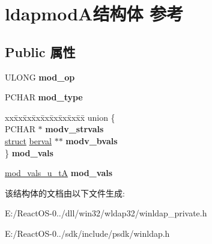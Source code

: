 \hypertarget{structldapmod_a}{}\section{ldapmod\+A结构体 参考}
\label{structldapmod_a}
\subsection*{Public 属性}
\begin{DoxyCompactItemize}
\item 
\mbox{\label{structldapmod_a_aae34504d657b9399ef92890842f23580}} 
U\+L\+O\+NG {\bfseries mod\+\_\+op}
\item 
\mbox{\label{structldapmod_a_a8e1766f8a58293366b605a2fedeafa39}} 
P\+C\+H\+AR {\bfseries mod\+\_\+type}
\item 
\mbox{\label{structldapmod_a_ad550aa9778210a4e11dfe0f7eaadda25}} 
\begin{tabbing}
xx\=xx\=xx\=xx\=xx\=xx\=xx\=xx\=xx\=\kill
union \{\\
\>PCHAR $\ast$ {\bfseries modv\_strvals}\\
\>\hyperlink{interfacestruct}{struct} \hyperlink{structberval}{berval} $\ast$$\ast$ {\bfseries modv\_bvals}\\
\} {\bfseries mod\_vals}\\

\end{tabbing}\item 
\mbox{\label{structldapmod_a_a90daa779a0c7492003755505ce8e3708}} 
\hyperlink{unionmod__vals__u_a}{mod\+\_\+vals\+\_\+u\+\_\+tA} {\bfseries mod\+\_\+vals}
\end{DoxyCompactItemize}


该结构体的文档由以下文件生成\+:\begin{DoxyCompactItemize}
\item 
E\+:/\+React\+O\+S-\/0../dll/win32/wldap32/winldap\+\_\+private.\+h\item 
E\+:/\+React\+O\+S-\/0../sdk/include/psdk/winldap.\+h\end{DoxyCompactItemize}
